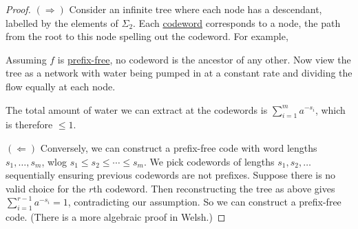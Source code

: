 \documentclass{article}
\newcommand{\1}[1]{\mathbbm{1}_{#1}}
\begin{document}
\begin{proof}
    $(\Rightarrow)$ Consider an infinite tree where each node has a descendant, labelled by the elements of $\Sigma_2$.
    Each \hyperlink{def:code}{codeword} corresponds to a node, the path from the root to this node spelling out the codeword.
    For example,
    \begin{center}
    \end{center}
    Assuming $f$ is \hyperlink{def:prefixFreeCode}{prefix-free}, no codeword is the ancestor of any other. Now view the tree as a network with water being pumped in at a constant rate and dividing the flow equally at each node.

    The total amount of water we can extract at the codewords is $\sum_{i=1}^m a^{-s_i}$, which is therefore $\leq 1$.

    $(\Leftarrow)$ Conversely, we can construct a prefix-free code with word lengths $s_1, \dotsc, s_m$, wlog $s_1 \leq s_2 \leq \dotsb \leq s_m$.
    We pick codewords of lengths $s_1, s_2, \dotsc$ sequentially ensuring previous codewords are not prefixes.
    Suppose there is no valid choice for the $r$th codeword.
    Then reconstructing the tree as above gives $ \sum_{i=1}^{r-1} a^{-s_i} = 1 $, contradicting our assumption.
    So we can construct a prefix-free code. (There is a more algebraic proof in Welsh.)
\end{proof}
\end{document}
